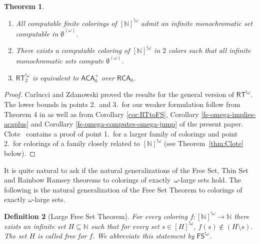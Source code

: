\documentclass{article}
\newcommand{\RCA}[0]{\mathsf{RCA}}
\newcommand{\ACA}[0]{\mathsf{ACA}}
\newcommand{\FS}[0]{\mathsf{FS}}
\newcommand{\RT}[0]{\mathsf{RT}}
\newcommand{\NN}[0]{\mathbb{N}}
\newtheorem{theorem}{Theorem}
\numberwithin{theorem}{section}
\newtheorem{definition}[theorem]{Definition}
\newcommand{\ludovic}[1]{\textcolor{blue}{#1}}
\begin{document}
\begin{theorem}\label{thm:car-zda}
\leavevmode
\begin{enumerate}
\item All computable finite colorings of  $[\NN]^{!\omega}$ admit an infinite monochromatic set computable in $\emptyset^{(\omega)}$. 
\item There exists a computable coloring of $[\NN]^{!\omega}$ in $2$ colors such that all infinite monochromatic sets compute 
$\emptyset^{(\omega)}$. 
\item $\RT^{!\omega}_2$ is equivalent to $\ACA_0^+$ over $\RCA_0$.
\end{enumerate}
\end{theorem}
\begin{proof}
Carlucci and Zdanowski \cite{carlucci2014strength} proved the results for the general version of $\RT^{!\omega}$. The lower bounds in points 2.~and 3.~for our weaker formulation follow from Theorem 4 in \cite{car-main-zda2024} as well as from Corollary \ref{cor:RTtoFS}, Corollary \ref{fs-omega-implies-acaplus} and Corollary \ref{fs-omega-computes-omega-jump} of the present paper. Clote~\cite{clote1986generalization} contains a proof of point 1.~for a larger family of colorings and point 2.~for colorings of a family closely related to $[\NN]^{!\omega}$ (see Theorem~\ref{thm:Clote} below).
\end{proof}


It is quite natural to ask if the natural generalizations of the Free Set, Thin Set and Rainbow Ramsey theorems to colorings of exactly~$\omega$-large sets hold. 
The following is the natural generalization of the Free Set Theorem to colorings of exactly $\omega$-large sets.

\begin{definition}[Large Free Set Theorem]\label{def:large_free}
For every coloring $f:[\NN]^{!\omega} \to \NN$ there exists an infinite set $H\subseteq\NN$ such that for every set $s \in [H]^{!\omega}$, $f(s) \notin (H \setminus s)$. The set $H$ is called \emph{free} for $f$. We abbreviate this statement by $\FS^{!\omega}$. 
\end{definition}

\end{document}
